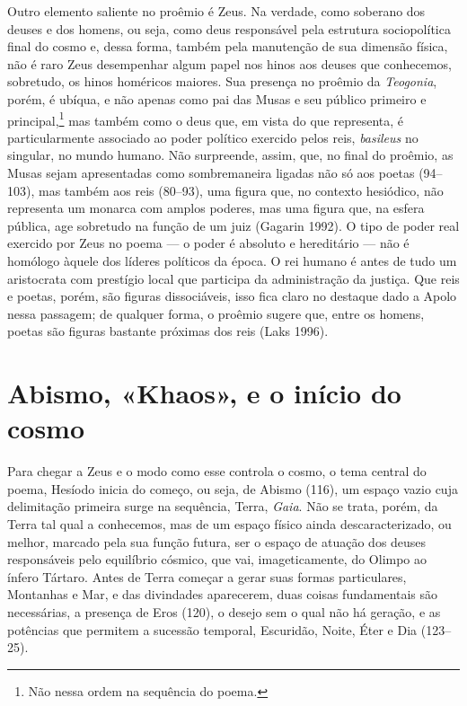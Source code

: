 Outro elemento saliente no proêmio é Zeus. Na verdade, como soberano dos
deuses e dos homens, ou seja, como deus responsável pela estrutura
sociopolítica final do cosmo e, dessa forma, também pela manutenção de
sua dimensão física, não é raro Zeus desempenhar algum papel nos hinos
aos deuses que conhecemos, sobretudo, os hinos homéricos maiores. Sua
presença no proêmio da \textit{Teogonia}, porém, é ubíqua, e não apenas
como pai das Musas e seu público primeiro e principal,\footnote{Não nessa ordem
na sequência do poema.} mas também como o deus que, em vista do que
representa, é particularmente associado ao poder político exercido pelos
reis, \textit{basileus} no singular, no mundo humano. Não surpreende,
assim, que, no final do proêmio, as Musas sejam apresentadas como
sombremaneira ligadas não só aos poetas (94--103), mas também aos reis
(80--93), uma figura que, no contexto hesiódico, não representa um
monarca com amplos poderes, mas uma figura que, na esfera pública, age
sobretudo na função de um juiz (Gagarin 1992). O tipo de poder real
exercido por Zeus no poema --- o poder é absoluto e hereditário --- não é
homólogo àquele dos líderes políticos da época. O rei humano é antes de
tudo um aristocrata com prestígio local que participa da administração
da justiça. Que reis e poetas, porém, são figuras dissociáveis, isso
fica claro no destaque dado a Apolo nessa passagem; de qualquer forma, o
proêmio sugere que, entre os homens, poetas são figuras bastante
próximas dos reis (Laks 1996).

\section{Abismo, «Khaos», e o início do cosmo}

Para chegar a Zeus e o modo como esse controla o cosmo, o tema central
do poema, Hesíodo inicia do começo, ou seja, de Abismo (116), um espaço
vazio cuja delimitação primeira surge na sequência, Terra, \textit{Gaia}.
Não se trata, porém, da Terra tal qual a conhecemos, mas de um espaço
físico ainda descaracterizado, ou melhor, marcado pela sua função
futura, ser o espaço de atuação dos deuses responsáveis pelo equilíbrio
cósmico, que vai, imageticamente, do Olimpo ao ínfero Tártaro. Antes de
Terra começar a gerar suas formas particulares, Montanhas e Mar, e das
divindades aparecerem, duas coisas fundamentais são necessárias, a
presença de Eros (120), o desejo sem o qual não há geração, e as
potências que permitem a sucessão temporal, Escuridão, Noite, Éter e Dia
(123--25).


